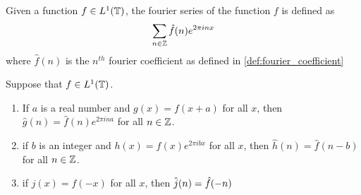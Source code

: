   \begin{definition}
    \label{def:fourier_series}
    Given a function $f \in L^1(\mathbb T)$, the fourier series of the function $f$ is defined as 
    \begin{displaymath}
      \sum_{n\in \mathbb Z} \hat{f}(n)e^{2\pi inx}
    \end{displaymath}
    where $\hat{f}(n)$ is the $n^{th}$ fourier coefficient as defined in \ref{def:fourier_coefficient} 
  \end{definition}

  \begin{theorem}
    \label{thm:properties_of_fourier_series}
    Suppose that $f\in L^1(\mathbb T)$.
    \begin{enumerate}[label=(\alph*)]
      \item If $a$ is a real number and $g(x) = f(x+a)$ for all $x$, then $\hat{g}(n) = \hat{f}(n)e^{2\pi ina}$ for all $n \in \mathbb Z$.
      \item if $b$ is an integer and $h(x) = f(x)e^{2\pi i bx}$ for all $x$, then $\hat{h}(n) = \hat{f}(n-b)$ for all $n\in \mathbb Z$.
      \item if $j(x) = f(-x)$ for all $x$, then $\hat{j}(n) = \hat{f}(-n)$
    \end{enumerate}
  \end{theorem}
